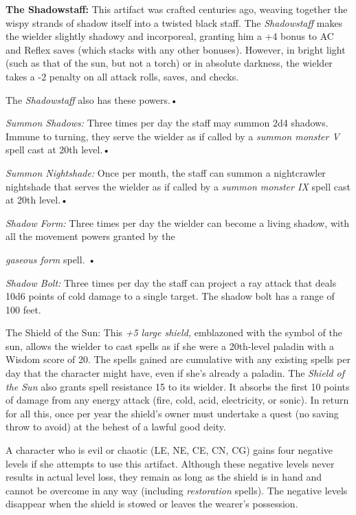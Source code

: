 \vspace{12pt}
\textbf{The Shadowstaff:} This artifact was crafted centuries ago, weaving together 
the wispy strands of shadow itself into a twisted black staff. The \textit{Shadowstaff 
}makes the wielder slightly shadowy and incorporeal, granting him a +4 bonus to 
AC and Reflex saves (which stacks with any other bonuses). However, in bright light 
(such as that of the sun, but not a torch) or in absolute darkness, the wielder 
takes a -2 penalty on all attack rolls, saves, and checks. 

The \textit{Shadowstaff }also has these powers.•

\textit{Summon Shadows: }Three times per day the staff may summon 2d4 shadows. 
Immune to turning, they serve the wielder as if called by a \textit{summon monster 
V }spell cast at 20th level.•

\textit{Summon Nightshade: }Once per month, the staff can summon a nightcrawler 
nightshade that serves the wielder as if called by a \textit{summon monster IX 
}spell cast at 20th level.•

\textit{Shadow Form: }Three times per day the wielder can become a living shadow, 
with all the movement powers granted by the

\textit{gaseous form }spell. •

\textit{Shadow Bolt: }Three times per day the staff can project a ray attack that 
deals 10d6 points of cold damage to a single target. The shadow bolt has a range 
of 100 feet.

\vspace{12pt}
The Shield of the Sun: This \textit{+5 large shield, }emblazoned with the symbol 
of the sun, allows the wielder to cast spells as if she were a 20th-level paladin 
with a Wisdom score of 20. The spells gained are cumulative with any existing spells 
per day that the character might have, even if she's already a paladin. The \textit{Shield 
of the Sun }also grants spell resistance 15 to its wielder. It absorbs the first 
10 points of damage from any energy attack (fire, cold, acid, electricity, or sonic). 
In return for all this, once per year the shield's owner must undertake a quest 
(no saving throw to avoid) at the behest of a lawful good deity. 

A character who is evil or chaotic (LE, NE, CE, CN, CG) gains four negative levels 
if she attempts to use this artifact. Although these negative levels never results 
in actual level loss, they remain as long as the shield is in hand and cannot be 
overcome in any way (including \textit{restoration }spells). The negative levels 
disappear when the shield is stowed or leaves the wearer's possession.

